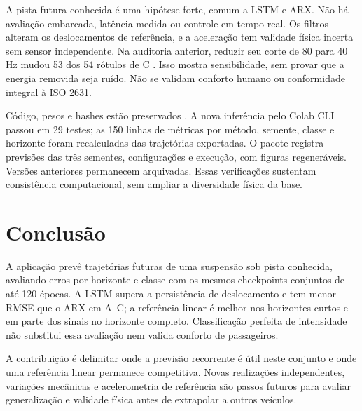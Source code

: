 \documentclass[conference]{IEEEtran}
\begin{document}
A pista futura conhecida é uma hipótese forte, comum a LSTM e ARX. Não há avaliação embarcada, latência medida ou controle em tempo real. Os filtros alteram os deslocamentos de referência, e a aceleração tem validade física incerta sem sensor independente. Na auditoria anterior, reduzir seu corte de 80 para 40 Hz mudou 53 dos 54 rótulos de C \cite{repo}. Isso mostra sensibilidade, sem provar que a energia removida seja ruído. Não se validam conforto humano ou conformidade integral à ISO 2631.

Código, pesos e hashes estão preservados \cite{repo}. A nova inferência pelo Colab CLI passou em 29 testes; as 150 linhas de métricas por método, semente, classe e horizonte foram recalculadas das trajetórias exportadas. O pacote registra previsões das três sementes, configurações e execução, com figuras regeneráveis. Versões anteriores permanecem arquivadas. Essas verificações sustentam consistência computacional, sem ampliar a diversidade física da base.

\section{Conclusão}
A aplicação prevê trajetórias futuras de uma suspensão sob pista conhecida, avaliando erros por horizonte e classe com os mesmos checkpoints conjuntos de até 120 épocas. A LSTM supera a persistência de deslocamento e tem menor RMSE que o ARX em A--C; a referência linear é melhor nos horizontes curtos e em parte dos sinais no horizonte completo. Classificação perfeita de intensidade não substitui essa avaliação nem valida conforto de passageiros.

A contribuição é delimitar onde a previsão recorrente é útil neste conjunto e onde uma referência linear permanece competitiva. Novas realizações independentes, variações mecânicas e acelerometria de referência são passos futuros para avaliar generalização e validade física antes de extrapolar a outros veículos.
\end{document}
